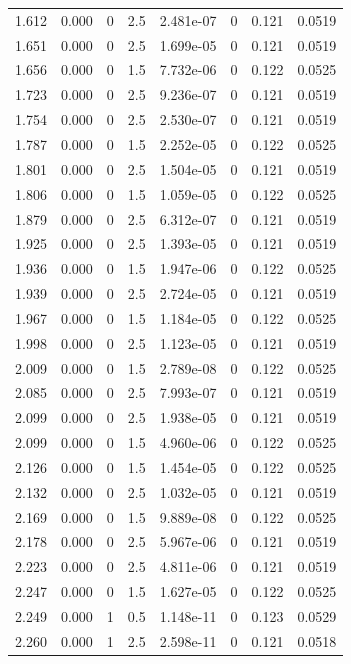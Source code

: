 \documentclass[preview]{standalone}
\begin{document}
{{{\begin{tabular}{L{1.2cm}C{1.2cm} C{0.3cm}C{0.5cm} C{1.4cm}C{1.4cm} C{1.4cm}C{1.4cm}}
  1.612  &  0.000  & 0     & 2.5 &  2.481e-07  & 0  & 0.121 &  0.0519   \\ 
  1.651  &  0.000  & 0     & 2.5 &  1.699e-05  & 0  & 0.121 &  0.0519   \\ 
  1.656  &  0.000  & 0     & 1.5 &  7.732e-06  & 0  & 0.122 &  0.0525   \\ 
  1.723  &  0.000  & 0     & 2.5 &  9.236e-07  & 0  & 0.121 &  0.0519   \\ 
  1.754  &  0.000  & 0     & 2.5 &  2.530e-07  & 0  & 0.121 &  0.0519   \\ 
  1.787  &  0.000  & 0     & 1.5 &  2.252e-05  & 0  & 0.122 &  0.0525   \\ 
  1.801  &  0.000  & 0     & 2.5 &  1.504e-05  & 0  & 0.121 &  0.0519   \\ 
  1.806  &  0.000  & 0     & 1.5 &  1.059e-05  & 0  & 0.122 &  0.0525   \\ 
  1.879  &  0.000  & 0     & 2.5 &  6.312e-07  & 0  & 0.121 &  0.0519   \\ 
  1.925  &  0.000  & 0     & 2.5 &  1.393e-05  & 0  & 0.121 &  0.0519   \\ 
  1.936  &  0.000  & 0     & 1.5 &  1.947e-06  & 0  & 0.122 &  0.0525   \\ 
  1.939  &  0.000  & 0     & 2.5 &  2.724e-05  & 0  & 0.121 &  0.0519   \\ 
  1.967  &  0.000  & 0     & 1.5 &  1.184e-05  & 0  & 0.122 &  0.0525   \\ 
  1.998  &  0.000  & 0     & 2.5 &  1.123e-05  & 0  & 0.121 &  0.0519   \\ 
  2.009  &  0.000  & 0     & 1.5 &  2.789e-08  & 0  & 0.122 &  0.0525   \\ 
  2.085  &  0.000  & 0     & 2.5 &  7.993e-07  & 0  & 0.121 &  0.0519   \\ 
  2.099  &  0.000  & 0     & 2.5 &  1.938e-05  & 0  & 0.121 &  0.0519   \\ 
  2.099  &  0.000  & 0     & 1.5 &  4.960e-06  & 0  & 0.122 &  0.0525   \\ 
  2.126  &  0.000  & 0     & 1.5 &  1.454e-05  & 0  & 0.122 &  0.0525   \\ 
  2.132  &  0.000  & 0     & 2.5 &  1.032e-05  & 0  & 0.121 &  0.0519   \\ 
  2.169  &  0.000  & 0     & 1.5 &  9.889e-08  & 0  & 0.122 &  0.0525   \\ 
  2.178  &  0.000  & 0     & 2.5 &  5.967e-06  & 0  & 0.121 &  0.0519   \\ 
  2.223  &  0.000  & 0     & 2.5 &  4.811e-06  & 0  & 0.121 &  0.0519   \\ 
  2.247  &  0.000  & 0     & 1.5 &  1.627e-05  & 0  & 0.122 &  0.0525   \\ 
  2.249  &  0.000  & 1     & 0.5 &  1.148e-11  & 0  & 0.123 &  0.0529   \\ 
  2.260  &  0.000  & 1     & 2.5 &  2.598e-11  & 0  & 0.121 &  0.0518   \\ 
\hline 
\end{tabular} 

}}}
\end{document}
